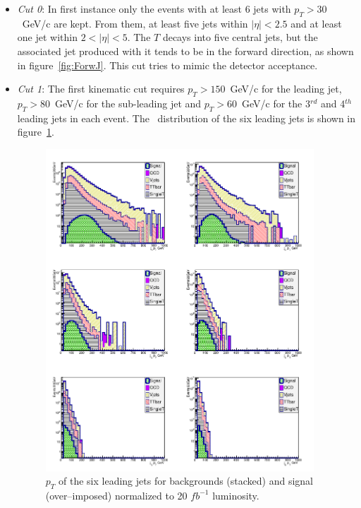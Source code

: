 \begin{itemize}

\item \textit{Cut 0}: In first instance only the events with at least 6 jets with $p_T > 30$~GeV/c are kept. From them, at least five jets within $|\eta|<2.5$ and at least one jet within $2<|\eta|<5$. The $T$ decays into five central jets, but the associated jet produced with it tends to be in the forward direction, as shown in figure~\ref{fig:ForwJ}. This cut tries to mimic the detector acceptance.

\item \textit{Cut 1}: The first kinematic cut requires $p_{T}>150$~GeV/c for the leading jet, $p_{T}>80$~GeV/c for the sub-leading jet and $p_{T}>60$~GeV/c for the 3$^{rd}$ and 4$^{th}$ leading jets in each event. The \pt~distribution of the six leading jets is shown in figure~\ref{fig:Var1}.

\begin{figure}[!Hhtbp]
  \begin{center}
    \includegraphics[width=0.95\textwidth]{figs/Pheno/JetPt.png}
    \caption{$p_{T}$  of the six leading jets for backgrounds (stacked) and signal (over--imposed) normalized to 20 $fb^{-1}$ luminosity.}
    \label{fig:Var1}
  \end{center}
\end{figure}


\end{itemize}
